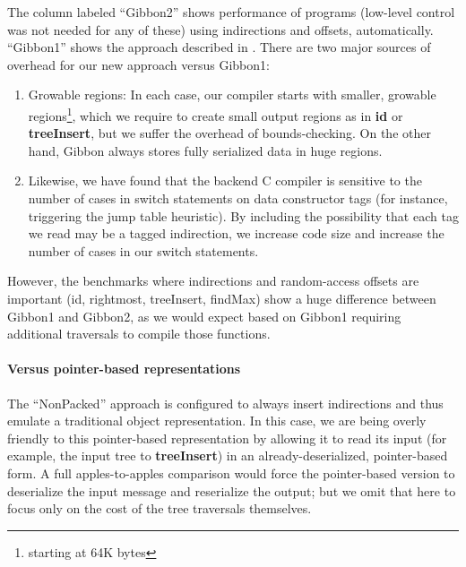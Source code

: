 The column labeled ``Gibbon2'' shows performance of \lamadt programs
(low-level \ourcalc control was not needed for any of these)
using indirections and offsets, automatically.
%
``Gibbon1'' shows the approach described in \cite{ecoop17-gibbon}.
%
There are two major sources of overhead for our new approach versus Gibbon1:

\begin{enumerate}
\item Growable regions:
In each case, our compiler starts with smaller, growable regions\footnote{starting at 64K bytes},
which we require to create small output regions as
in {\bf id} or {\bf treeInsert},
but we suffer the overhead of bounds-checking. On the other hand,
Gibbon always stores fully serialized data in huge regions.

\item Likewise, we have found that the backend C compiler is sensitive to the number
of cases in switch statements on data constructor tags (for instance, triggering
the jump table heuristic).  By including the possibility that each tag we read
may be a tagged indirection,
we increase
code size and increase the number of cases in our switch statements.
\end{enumerate}


However, the benchmarks where indirections and random-access offsets are important (id,
rightmost, treeInsert, findMax) show a huge difference between Gibbon1 and Gibbon2,
as we would expect based on Gibbon1
requiring additional traversals to compile those functions.

\paragraph{Versus pointer-based representations}
The ``NonPacked'' approach is \ourcalc configured to always insert indirections
and thus emulate a traditional object representation.
%
In this case, we are being overly friendly to this pointer-based representation by
allowing it to read its input (for example, the input tree to {\bf treeInsert})
in an already-deserialized, pointer-based form.  A full apples-to-apples
comparison would force the pointer-based version to deserialize the input
message and reserialize the output; but we omit that here to focus only on the
cost of the tree traversals themselves.
%

